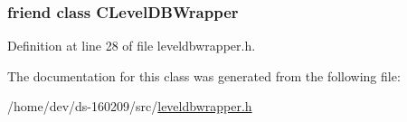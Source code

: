 \subsubsection[{C\+Level\+D\+B\+Wrapper}]{\setlength{\rightskip}{0pt plus 5cm}friend class {\bf C\+Level\+D\+B\+Wrapper}\hspace{0.3cm}{\ttfamily [friend]}}\label{class_c_level_d_b_batch_acbe5e6be88c5bccb0ec229ebc91dde82}


Definition at line 28 of file leveldbwrapper.\+h.



The documentation for this class was generated from the following file\+:\begin{DoxyCompactItemize}
\item 
/home/dev/ds-\/160209/src/\hyperlink{leveldbwrapper_8h}{leveldbwrapper.\+h}\end{DoxyCompactItemize}
